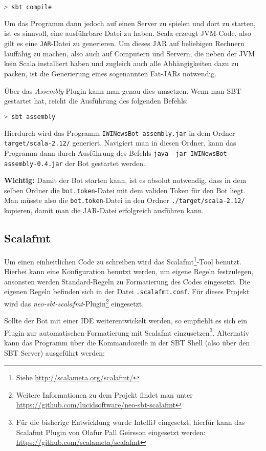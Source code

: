 \begin{lstlisting}[language=bash]
> sbt compile
\end{lstlisting}

Um das Programm dann jedoch auf einen Server zu spielen und dort zu starten, ist es sinnvoll, eine ausführbare Datei zu haben. Scala erzeugt JVM-Code, also gilt es eine \texttt{JAR}-Datei zu generieren. Um dieses JAR auf beliebigen Rechnern lauffähig zu machen, also auch auf Computern und Servern, die neben der JVM kein Scala installiert haben und zugleich auch alle Abhängigkeiten dazu zu packen, ist die Generierung eines sogenannten Fat-JARs notwendig.

Über das \emph{Assembly}-Plugin kann man genau dies umsetzen. Wenn man SBT gestartet hat, reicht die Ausführung des folgenden Befehls:

\begin{lstlisting}[language=bash]
> sbt assembly
\end{lstlisting}

Hierdurch wird das Programm \texttt{IWINewsBot\allowbreak-assembly\allowbreak.jar} in dem Ordner \texttt{target\allowbreak/scala-2.12/} generiert. Navigiert man in diesen Ordner, kann das Programm dann durch Ausführung des Befehls \texttt{java -jar IWINewsBot-assembly-0.4.jar} der Bot gestartet werden.

\textbf{Wichtig:} Damit der Bot starten kann, ist es absolut notwendig, dass in dem selben Ordner die \texttt{bot.token}-Datei mit dem validen Token für den Bot liegt. Man müsste also die \texttt{bot.token}-Datei in den Ordner \texttt{./target/scala-2.12/} kopieren, damit man die JAR-Datei erfolgreich ausführen kann.

\subsection{Scalafmt}
Um einen einheitlichen Code zu schreiben wird das Scalafmt\footnote{Siehe \url{http://scalameta.org/scalafmt/}}-Tool benutzt. Hierbei kann eine Konfiguration benutzt werden, um eigene Regeln festzulegen, ansonsten werden Standard-Regeln zu Formatierung des Codes eingesetzt. Die eigenen Regeln befinden sich in der Datei \texttt{.scalafmt.conf}. Für dieses Projekt wird das \emph{neo-sbt-scalafmt}-Plugin\footnote{Weitere Informationen zu dem Projekt findet man unter \url{https://github.com/lucidsoftware/neo-sbt-scalafmt}} eingesetzt.

Sollte der Bot mit einer IDE weiterentwickelt werden, so empfiehlt es sich ein Plugin zur automatischen Formatierung mit Scalafmt einzusetzen\footnote{Für die bisherige Entwicklung wurde IntelliJ eingesetzt, hierfür kann das Scalafmt Plugin von Olafur Pall Geirsson eingesetzt werden: \url{https://github.com/scalameta/scalafmt}}. Alternativ kann das Programm über die Kommandozeile in der SBT Shell (also über den SBT Server) ausgeführt werden:

